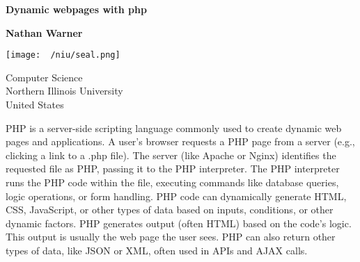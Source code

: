 \documentclass{report}
\title{\Huge{}}
\author{\huge{Nathan Warner}}
\date{\huge{}}
\begin{document}
        \begin{titlepage}
       \begin{center}
           \vspace*{1cm}
    
           \textbf{Dynamic webpages with php}
    
           \vspace{0.5cm}
            
                
           \vspace{1.5cm}
    
           \textbf{Nathan Warner}
    
           \vfill
                
                
           \vspace{0.8cm}
         
           \texttt{[image: ~/niu/seal.png]}
                
           Computer Science \\
           Northern Illinois University\\
           United States\\
           
                
       \end{center}
    \end{titlepage}
    \tableofcontents
    \pagebreak 
    \bigbreak \noindent 
    PHP is a server-side scripting language commonly used to create dynamic web pages and applications.
    \bigbreak \noindent 
    A user’s browser requests a PHP page from a server (e.g., clicking a link to a .php file).
    \bigbreak \noindent 
    The server (like Apache or Nginx) identifies the requested file as PHP, passing it to the PHP interpreter.
    \bigbreak \noindent 
    The PHP interpreter runs the PHP code within the file, executing commands like database queries, logic operations, or form handling.
    \bigbreak \noindent 
    PHP code can dynamically generate HTML, CSS, JavaScript, or other types of data based on inputs, conditions, or other dynamic factors.
    \bigbreak \noindent 
    PHP generates output (often HTML) based on the code’s logic. This output is usually the web page the user sees.
    \bigbreak \noindent 
    PHP can also return other types of data, like JSON or XML, often used in APIs and AJAX calls.
\end{document}
